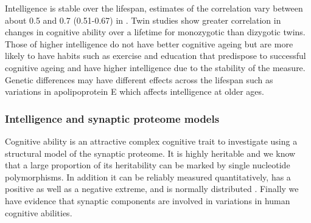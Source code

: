 Intelligence is stable over the lifespan, estimates of the correlation vary between about 0.5 and 0.7 (0.51-0.67) in \cite{gow2011stability}. Twin studies %
 show greater correlation in changes in cognitive ability over a lifetime for monozygotic than dizygotic twins\cite{deary2009genetic}. 
Those of higher intelligence do not have better cognitive ageing but are more likely to have habits such as exercise and education that predispose to successful cognitive ageing\cite{deary2014stability} and have higher intelligence due to the stability of the measure\cite{gow2011stability}.%
Genetic differences may have different effects across the lifespan such as variations in apolipoprotein E which affects intelligence at older ages\cite{deary2002cognitive}.


\subsubsection{Intelligence and synaptic proteome models}
\label{sec:intelligence and synaptic proteome models}
Cognitive ability is an attractive complex cognitive trait to investigate using a structural model of the synaptic proteome. It is highly heritable and we know that a large proportion of its heritability can be marked by single nucleotide polymorphisms. In addition it can be reliably measured quantitatively, has a positive as well as a negative extreme, and is normally distributed \cite{plomin2015genetics}.
Finally we have evidence that synaptic components are involved in variations in human cognitive abilities\cite{hill2014human}. 

